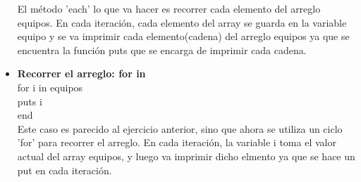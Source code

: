 \documentclass[11pt]{article} %
\begin{document}
\begin{itemize}
     El método 'each' lo que va hacer es recorrer cada elemento del arreglo equipos. En cada iteración, cada elemento del array se guarda en la variable equipo y se va imprimir cada elemento(cadena) del arreglo equipos ya que se encuentra la función puts que se encarga de        imprimir cada cadena.

     \item {\bf Recorrer el arreglo: for in}\\
	\hspace*{7mm} for i in equipos\\
  	\hspace*{14mm}  puts i\\
	\hspace*{7mm} end\\
     \hspace*{7mm} Este caso es parecido al ejercicio anterior, sino que ahora se utiliza un ciclo 'for' para recorrer el arreglo. En cada iteración, la variable i toma el valor actual del array equipos, y luego va imprimir dicho elmento ya que se hace un put en cada iteración.\\




\end{itemize}
\end{document}
